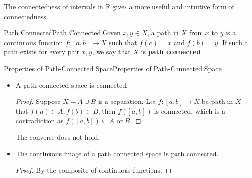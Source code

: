 \documentclass[../main.tex]{subfiles}
\begin{document}
The connectedness of intervals in $\mathbb{R}$ gives a more useful and intuitive form of connectedness.

\begin{definition}{Path Connected}{Path Connected}
	Given $x,y\in X$, a path in $X$ from $x$ to $y$ is a continuous function $f:[a,b] \rightarrow X$ such that $f(a) = x$ and $f(b) = y$. If such a path exists for every pair $x,y$, we say that $X$ is \textbf{path connected}.
\end{definition}

\begin{proposition}{Properties of Path-Connected Space}{Properties of Path-Connected Space}
\begin{itemize}
\item A path connected space is connected.
\begin{proof}
	Suppose $X = A \cup B$ is a separation. Let $f:[a,b] \rightarrow X$ be path in $X$ that $f(a)\in A, f(b)\in B$, then $f([a,b])$ is connected, which is a contradiction as $f([a,b]) \subseteq A$ or $B$.
\end{proof}

The converse does not hold.

\item The continuous image of a path connected space is path connected.
	\begin{proof}
	By the composite of continuous functions.
	\end{proof}
\end{itemize}
\end{proposition}
\end{document}
